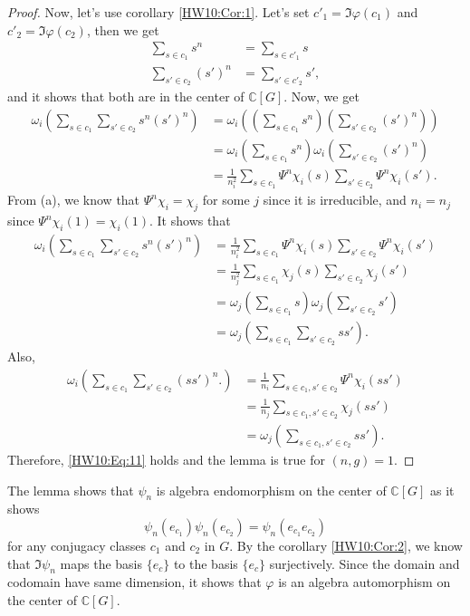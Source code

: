 \documentclass[a4paper, 12pt]{article}
\theoremstyle{Mydefinition}
\theoremstyle{Mytheorem}
\begin{document}
\begin{enumerate}
\begin{proof}
Now, let's use corollary \ref{HW10:Cor:1}. Let's set $c'_1 = \Im \varphi(c_1)$ and $c'_2 = \Im\varphi(c_2)$, then we get
\begin{equation}
\begin{split}
    \sum_{s\in c_1}s^n &= \sum_{s\in c'_1}s\\
    \sum_{s'\in c_2}(s')^n &=\sum_{s'\in c'_2}s',
\end{split}
\end{equation}
and it shows that both are in the center of $\mathbb{C}[G]$. Now, we get
\begin{equation}
\begin{split}
    \omega_i\left(\sum_{s\in c_1}\sum_{s'\in c_2}s^n(s')^n\right) &=\omega_i\left(\left(\sum_{s\in c_1}s^n\right)\left(\sum_{s'\in c_2}(s')^n\right)\right)\\
    &=\omega_i\left(\sum_{s\in c_1}s^n\right)\omega_i\left(\sum_{s'\in c_2}(s')^n\right)\\
    &=\frac{1}{n^2_i}\sum_{s\in c_1}\Psi^n\chi_i(s)\sum_{s'\in c_2}\Psi^n\chi_i(s').
\end{split}
\end{equation}
From (a), we know that $\Psi^n\chi_i = \chi_j$ for some $j$ since it is irreducible, and $n_i=n_j$ since $\Psi^n\chi_i(1) = \chi_i(1)$. It shows that
\begin{equation}
\begin{split}
    \omega_i\left(\sum_{s\in c_1}\sum_{s'\in c_2}s^n(s')^n\right) &=\frac{1}{n^2_i}\sum_{s\in c_1}\Psi^n\chi_i(s)\sum_{s'\in c_2}\Psi^n\chi_i(s')\\
    &=\frac{1}{n^2_j}\sum_{s\in c_1}\chi_j(s)\sum_{s'\in c_2}\chi_j(s')\\
    &=\omega_j\left(\sum_{s\in c_1}s\right)\omega_j\left(\sum_{s'\in c_2}s'\right)\\
    &=\omega_j\left(\sum_{s\in c_1}\sum_{s'\in c_2}ss'\right).
\end{split}
\end{equation}
Also,
\begin{equation}
    \begin{split}
        \omega_i\left(\sum_{s\in c_1}\sum_{s'\in c_2}(ss')^n.\right) &= \frac{1}{n_i}\sum_{s\in c_1,s'\in c_2}\Psi^n \chi_i(ss')\\
        &=\frac{1}{n_j}\sum_{s\in c_1,s'\in c_2}\chi_j(ss')\\
        &=\omega_j\left(\sum_{s\in c_1,s'\in c_2}ss'\right).
    \end{split}
\end{equation}
Therefore, \eqref{HW10:Eq:11} holds and the lemma is true for $(n,g)=1$.
\end{proof}
The lemma shows that $\psi_n$ is algebra endomorphism on the center of $\mathbb{C}[G]$ as it shows
\begin{equation}
    \psi_n(e_{c_1})\psi_n(e_{c_2}) = \psi_n(e_{c_1}e_{c_2})
\end{equation}
for any conjugacy classes $c_1$ and $c_2$ in $G$. By the corollary \ref{HW10:Cor:2}, we know that $\Im\psi_n$ maps the basis $\{e_c\}$ to the basis $\{e_c\}$ surjectively. Since the domain and codomain have same dimension, it shows that $\varphi$ is an algebra automorphism on the center of $\mathbb{C}[G]$. 
\end{enumerate}
\end{document}
